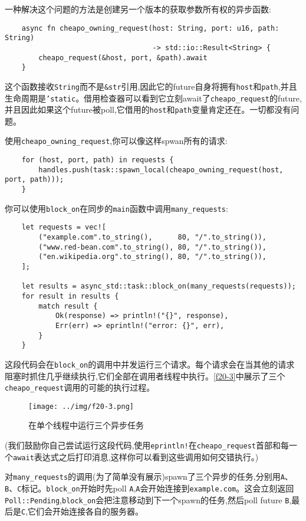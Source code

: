 一种解决这个问题的方法是创建另一个版本的获取参数所有权的异步函数:
\begin{verbatim}
    async fn cheapo_owning_request(host: String, port: u16, path: String)
                                   -> std::io::Result<String> {
        cheapo_request(&host, port, &path).await
    }
\end{verbatim}

这个函数接收\texttt{String}而不是\texttt{\&str}引用,因此它的future自身将拥有\texttt{host}和\texttt{path},并且生命周期是\texttt{'static}。借用检查器可以看到它立刻await了\texttt{cheapo\_request}的future,并且因此如果这个future被poll,它借用的\texttt{host}和\texttt{path}变量肯定还在。一切都没有问题。

使用\texttt{cheapo\_owning\_request},你可以像这样spwan所有的请求:
\begin{verbatim}
    for (host, port, path) in requests {
        handles.push(task::spawn_local(cheapo_owning_request(host, port, path)));
    }
\end{verbatim}

你可以使用\texttt{block\_on}在同步的\texttt{main}函数中调用\texttt{many\_requests}:
\begin{verbatim}
    let requests = vec![
        ("example.com".to_string(),      80, "/".to_string()),
        ("www.red-bean.com".to_string(), 80, "/".to_string()),
        ("en.wikipedia.org".to_string(), 80, "/".to_string()),
    ];

    let results = async_std::task::block_on(many_requests(requests));
    for result in results {
        match result {
            Ok(response) => println!("{}", response),
            Err(err) => eprintln!("error: {}", err),
        }
    }
\end{verbatim}

这段代码会在\texttt{block\_on}的调用中并发运行三个请求。每个请求会在当其他的请求阻塞时抓住几乎继续执行,它们全部在调用者线程中执行。\autoref{f20-3}中展示了三个\texttt{cheapo\_request}调用的可能的执行过程。

\begin{figure}[htbp]
    \centering
    \texttt{[image: ../img/f20-3.png]}
    \caption{在单个线程中运行三个异步任务}
    \label{f20-3}
\end{figure}

(我们鼓励你自己尝试运行这段代码,使用\texttt{eprintln!}在\texttt{cheapo\_request}首部和每一个\texttt{await}表达式之后打印消息,这样你可以看到这些调用如何交错执行。)

对\texttt{many\_requests}的调用(为了简单没有展示)spawn了三个异步的任务,分别用\texttt{A}、\texttt{B}、\texttt{C}标记。\texttt{block\_on}开始时先poll \texttt{A},\texttt{A}会开始连接到\texttt{example.com}。这会立刻返回\texttt{Poll::Pending},\texttt{block\_on}会把注意移动到下一个spawn的任务,然后poll future \texttt{B},最后是\texttt{C},它们会开始连接各自的服务器。

